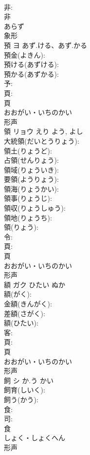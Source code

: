 \documentclass[8pt]{extreport}
\begin{document}
\begin{CJK}{UTF8}{min}
\\	非: 
\\	非	
\\	あらず	
\\	象形 
\\	預	ヨ	あず.ける、あず.かる		
\\	預金(よきん): 
\\	預ける(あずける): 
\\	預かる(あずかる): 
\\	予: 
\\	頁: 
\\	頁	
\\	おおがい・いちのかい	
\\	形声 
\\	領	リョウ	えり	よう, よし	
\\	大統領(だいとうりょう): 
\\	領土(りょうど): 
\\	占領(せんりょう): 
\\	領域(りょういき): 
\\	要領(ようりょう): 
\\	領海(りょうかい): 
\\	領事(りょうじ): 
\\	領収(りょうしゅう): 
\\	領地(りょうち): 
\\	領(りょう): 
\\	令: 
\\	頁: 
\\	頁	
\\	おおがい・いちのかい	
\\	形声 
\\	額	ガク	ひたい	ぬか	
\\	額(がく): 
\\	金額(きんがく): 
\\	差額(さがく): 
\\	額(ひたい): 
\\	客: 
\\	頁: 
\\	頁	
\\	おおがい・いちのかい	
\\	形声 
\\	飼	シ	か.う	かい	
\\	飼育(しいく): 
\\	飼う(かう): 
\\	食: 
\\	司: 
\\	食	
\\	しょく・しょくへん	
\\	形声 

\end{CJK}
\end{document}
